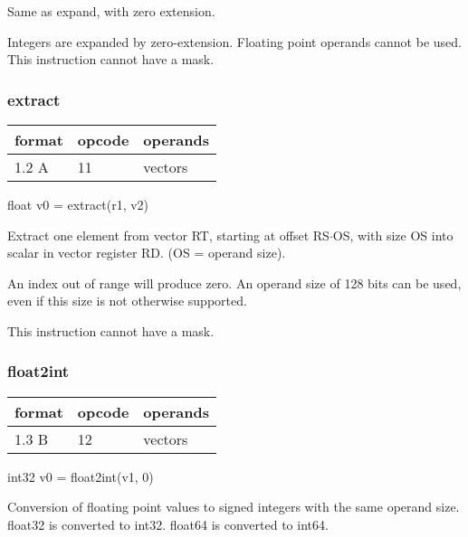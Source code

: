 \documentclass[forwardcom.tex]{subfiles}
\begin{document}
Same as expand, with zero extension.
\vspace{2mm}

Integers are expanded by zero-extension. Floating point operands cannot be used. 
This instruction cannot have a mask.

\subsubsection{extract}
\label{table:extractInstruction}
\begin{tabular}{|p{12mm}|p{12mm}|p{110mm}|}
\hline
\bfseries format & \bfseries opcode & \bfseries operands \\ \hline
1.2 A & 11 & vectors  \\ \hline
\end{tabular}
\vspace{2mm}

float v0 = extract(r1, v2)
\vspace{2mm}

Extract one element from vector RT, starting at offset RS$\cdot$OS, with size OS into scalar in vector register RD. (OS = operand size).
\vspace{2mm}

An index out of range will produce zero. An operand size of 128 bits can be used, even if this size is not otherwise supported.
\vspace{2mm}

This instruction cannot have a mask.

\subsubsection{float2int}
\label{table:extractInstruction}
\begin{tabular}{|p{12mm}|p{12mm}|p{110mm}|}
\hline
\bfseries format & \bfseries opcode & \bfseries operands \\ \hline
1.3 B & 12 & vectors  \\ \hline
\end{tabular}
\vspace{2mm}

int32 v0 = float2int(v1, 0)
\vspace{2mm}

Conversion of floating point values to signed integers with the same operand size.\\ 
float32 is converted to int32. float64 is converted to int64.
\vspace{2mm}
\end{document}
